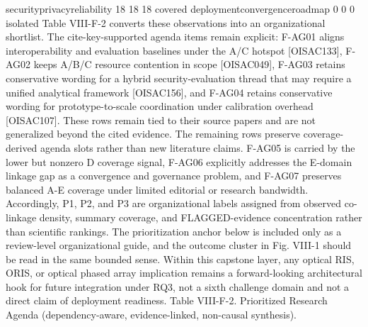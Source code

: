 {}\markdownRendererPipe{} security\markdownRendererUnderscore{}privacy\markdownRendererUnderscore{}reliability \markdownRendererPipe{} 18 \markdownRendererPipe{} 18 \markdownRendererPipe{} 18 \markdownRendererPipe{} covered \markdownRendererPipe{}\markdownRendererSoftLineBreak
{}\markdownRendererPipe{} deployment\markdownRendererUnderscore{}convergence\markdownRendererUnderscore{}roadmap \markdownRendererPipe{} 0 \markdownRendererPipe{} 0 \markdownRendererPipe{} 0 \markdownRendererPipe{} isolated \markdownRendererPipe{}\markdownRendererParagraphSeparator
{}Table VIII-F-2 converts these observations into an organizational shortlist. The cite-key-supported agenda items remain explicit: F-AG01 aligns interoperability and evaluation baselines under the A/C hotspot [O\markdownRendererUnderscore{}ISAC\markdownRendererUnderscore{}133], F-AG02 keeps A/B/C resource contention in scope [O\markdownRendererUnderscore{}ISAC\markdownRendererUnderscore{}049], F-AG03 retains conservative wording for a hybrid security-evaluation thread that may require a unified analytical framework [O\markdownRendererUnderscore{}ISAC\markdownRendererUnderscore{}156], and F-AG04 retains conservative wording for prototype-to-scale coordination under calibration overhead [O\markdownRendererUnderscore{}ISAC\markdownRendererUnderscore{}107]. These rows remain tied to their source papers and are not generalized beyond the cited evidence.\markdownRendererParagraphSeparator
{}The remaining rows preserve coverage-derived agenda slots rather than new literature claims. F-AG05 is carried by the lower but nonzero D coverage signal, F-AG06 explicitly addresses the E-domain linkage gap as a convergence and governance problem, and F-AG07 preserves balanced A-E coverage under limited editorial or research bandwidth. Accordingly, P1, P2, and P3 are organizational labels assigned from observed co-linkage density, summary coverage, and FLAGGED-evidence concentration rather than scientific rankings. The prioritization anchor below is included only as a review-level organizational guide, and the outcome cluster in Fig. VIII-1 should be read in the same bounded sense.\markdownRendererParagraphSeparator
{}Within this capstone layer, any optical RIS, ORIS, or optical phased array implication remains a forward-looking architectural hook for future integration under RQ3, not a sixth challenge domain and not a direct claim of deployment readiness.\markdownRendererParagraphSeparator
{}Table VIII-F-2. Prioritized Research Agenda (dependency-aware, evidence-linked, non-causal synthesis).\markdownRendererParagraphSeparator
